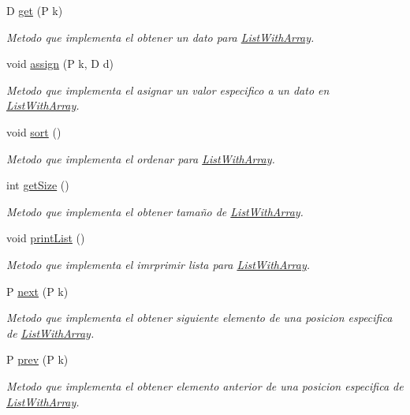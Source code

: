 \begin{DoxyCompactItemize}
D \hyperlink{class_list_with_array_a20cfc82811967bc2a77a6e43b9cebb46}{get} (P k)
\begin{DoxyCompactList}\small\item\em Metodo que implementa el obtener un dato para \hyperlink{class_list_with_array}{List\+With\+Array}. \end{DoxyCompactList}\item 
void \hyperlink{class_list_with_array_a9dd1fd2337c6c8d437de71aae0e816c8}{assign} (P k, D d)
\begin{DoxyCompactList}\small\item\em Metodo que implementa el asignar un valor especifico a un dato en \hyperlink{class_list_with_array}{List\+With\+Array}. \end{DoxyCompactList}\item 
void \hyperlink{class_list_with_array_a1a0ec4ab4a8fcb1a20568445ad892c9a}{sort} ()
\begin{DoxyCompactList}\small\item\em Metodo que implementa el ordenar para \hyperlink{class_list_with_array}{List\+With\+Array}. \end{DoxyCompactList}\item 
int \hyperlink{class_list_with_array_ae7a071bcdde9ddbf4c40a716f5a09434}{get\+Size} ()
\begin{DoxyCompactList}\small\item\em Metodo que implementa el obtener tamaño de \hyperlink{class_list_with_array}{List\+With\+Array}. \end{DoxyCompactList}\item 
void \hyperlink{class_list_with_array_a515ea38cb40ba7b0c9df98825b2dd270}{print\+List} ()
\begin{DoxyCompactList}\small\item\em Metodo que implementa el imrprimir lista para \hyperlink{class_list_with_array}{List\+With\+Array}. \end{DoxyCompactList}\item 
P \hyperlink{class_list_with_array_a125811011abb77c1b11e5150f4524fb1}{next} (P k)
\begin{DoxyCompactList}\small\item\em Metodo que implementa el obtener siguiente elemento de una posicion especifica de \hyperlink{class_list_with_array}{List\+With\+Array}. \end{DoxyCompactList}\item 
P \hyperlink{class_list_with_array_a72f0d74c4ae1fd4697088114db41d442}{prev} (P k)
\begin{DoxyCompactList}\small\item\em Metodo que implementa el obtener elemento anterior de una posicion especifica de \hyperlink{class_list_with_array}{List\+With\+Array}. \end{DoxyCompactList}\item 

\end{DoxyCompactItemize}
